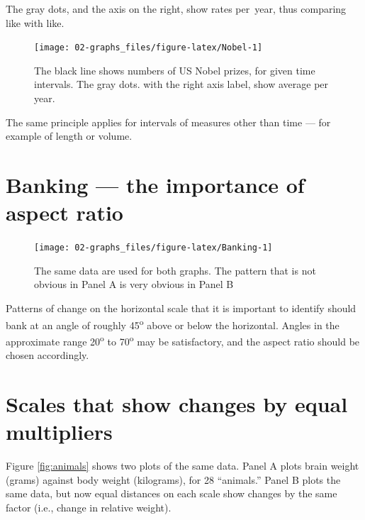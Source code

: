 \documentclass[
  10pt,
  b5paper]{book}
\begin{document}
The gray dots, and the axis on the right, show rates per~year,
thus comparing like with like.

\begin{figure}[H]

{\centering \texttt{[image: 02-graphs\_files/figure-latex/Nobel-1]} 

}

\caption{The black line shows numbers of US Nobel prizes, for given time intervals. The gray dots. with the right axis label, show average per year.}\label{fig:Nobel}
\end{figure}

The same principle applies for intervals of measures
other than time --- for example of length or volume.

\hypertarget{banking-the-importance-of-aspect-ratio}{%
\section{Banking --- the importance of aspect ratio}\label{banking-the-importance-of-aspect-ratio}}

\begin{figure}[H]

{\centering \texttt{[image: 02-graphs\_files/figure-latex/Banking-1]} 

}

\caption{The same data are used for both graphs.  The pattern that is not
obvious in Panel A is very obvious in Panel B}\label{fig:Banking}
\end{figure}

Patterns of change on the horizontal scale that it is
important to identify should bank at an angle of roughly 45\textsuperscript{o}
above or below the horizontal. Angles in
the approximate range 20\textsuperscript{o} to 70\textsuperscript{o} may be satisfactory,
and the aspect ratio should be chosen accordingly.

\hypertarget{scales-that-show-changes-by-equal-multipliers}{%
\section{Scales that show changes by equal multipliers}\label{scales-that-show-changes-by-equal-multipliers}}

Figure \ref{fig:animals} shows two plots of the same data.
Panel A plots brain weight (grams) against body weight (kilograms),
for 28 ``animals.'' Panel B plots the same data, but now equal distances
on each scale show changes by the same factor (i.e., change in relative
weight).
\end{document}
